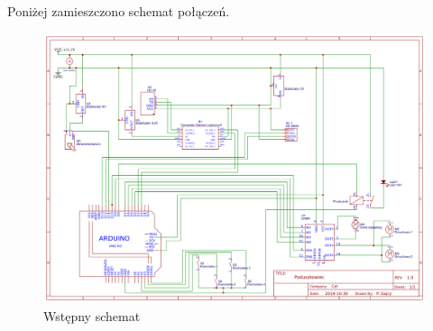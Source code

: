 \documentclass[test.tex]{subfiles}
\begin{document}
Poniżej zamieszczono schemat połączeń.

\begin{figure}[h]
\centering
\includegraphics[width=1\textwidth]{../schemat/schemat_aktualny.png}
\caption{Wstępny schemat}
\label{schemat_ogólny}
\end{figure}


 
\end{document}
